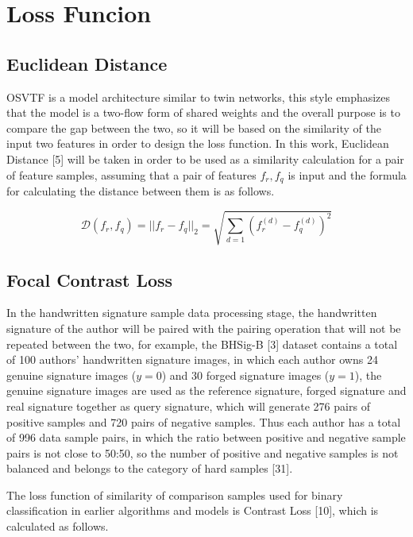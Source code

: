 \section{Loss Funcion}

\subsection{Euclidean Distance}

OSVTF is a model architecture similar to twin networks, this style emphasizes that the model is a two-flow form of shared weights and the overall purpose is to compare the gap between the two, so it will be based on the similarity of the input two features in order to design the loss function. In this work, Euclidean Distance [5] will be taken in order to be used as a similarity calculation for a pair of feature samples, assuming that a pair of features $f_r,f_q$ is input and the formula for calculating the distance between them is as follows.

\begin{equation}
\label{eq14}
  \mathcal{D}(f_r, f_q) = ||f_r - f_q||_2=\sqrt{\sum_{d=1}(f^{(d)}_r - f^{(d)}_q)^2}
\end{equation}

\subsection{Focal Contrast Loss}

In the handwritten signature sample data processing stage, the handwritten signature of the author will be paired with the pairing operation that will not be repeated between the two, for example, the BHSig-B [3] dataset contains a total of 100 authors' handwritten signature images, in which each author owns 24 genuine signature images ($y=0$) and 30 forged signature images ($y=1$), the genuine signature images are used as the reference signature, forged signature and real signature together as query signature, which will generate 276 pairs of positive samples and 720 pairs of negative samples. Thus each author has a total of 996 data sample pairs, in which the ratio between positive and negative sample pairs is not close to 50:50, so the number of positive and negative samples is not balanced and belongs to the category of hard samples [31]. 

The loss function of similarity of comparison samples used for binary classification in earlier algorithms and models is Contrast Loss [10], which is calculated as follows.

